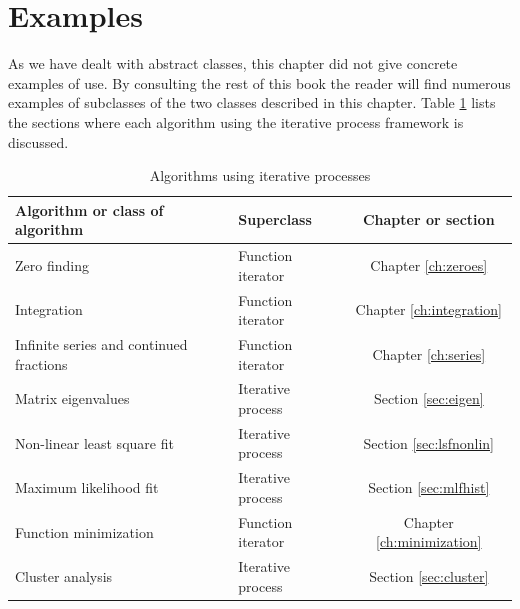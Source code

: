 \section{Examples}
As we have dealt with abstract classes, this chapter did not give
concrete examples of use. By consulting the rest of this book the
reader will find numerous examples of subclasses of the two
classes described in this chapter. Table \ref{tb:iteration} lists
the sections where each algorithm using the iterative process
framework is discussed.
\begin{table}[h]
  \centering
  \caption{Algorithms using iterative processes}\label{tb:iteration}
\vspace{1 ex}
\begin{tabular}{|l|l|c|} \hline
\textbf{Algorithm or class of algorithm}&\textbf{Superclass}&\textbf{
Chapter or section}
\\ \hline Zero finding&Function iterator&Chapter \ref{ch:zeroes}
\\ \hline Integration&Function iterator&Chapter
\ref{ch:integration}
\\ \hline Infinite series and continued fractions&Function
iterator&Chapter \ref{ch:series}  \\ \hline Matrix
eigenvalues&Iterative process&Section \ref{sec:eigen}
\\ \hline Non-linear least square fit&Iterative process&Section
\ref{sec:lsfnonlin}
\\ \hline Maximum likelihood fit&Iterative process&Section \ref{sec:mlfhist} \\
\hline Function minimization&Function iterator&Chapter
\ref{ch:minimization}  \\ \hline Cluster analysis&Iterative
process&Section \ref{sec:cluster} \\ \hline
\end{tabular}

\end{table}

